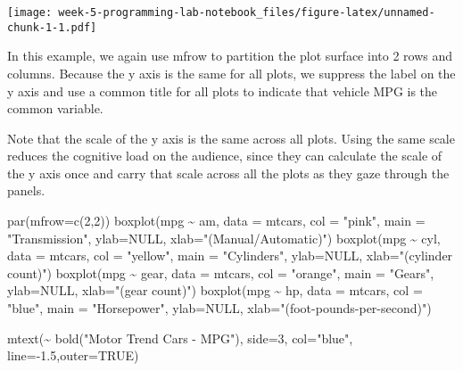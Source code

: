 \documentclass[
]{article}
\newenvironment{Shaded}{\begin{snugshade}}{\end{snugshade}}
\newcommand{\AttributeTok}[1]{\textcolor[rgb]{0.77,0.63,0.00}{#1}}
\newcommand{\ConstantTok}[1]{\textcolor[rgb]{0.00,0.00,0.00}{#1}}
\newcommand{\DecValTok}[1]{\textcolor[rgb]{0.00,0.00,0.81}{#1}}
\newcommand{\FloatTok}[1]{\textcolor[rgb]{0.00,0.00,0.81}{#1}}
\newcommand{\FunctionTok}[1]{\textcolor[rgb]{0.00,0.00,0.00}{#1}}
\newcommand{\NormalTok}[1]{#1}
\newcommand{\SpecialCharTok}[1]{\textcolor[rgb]{0.00,0.00,0.00}{#1}}
\newcommand{\StringTok}[1]{\textcolor[rgb]{0.31,0.60,0.02}{#1}}
\begin{document}
\texttt{[image: week-5-programming-lab-notebook\_files/figure-latex/unnamed-chunk-1-1.pdf]}

In this example, we again use mfrow to partition the plot surface into 2
rows and columns. Because the y axis is the same for all plots, we
suppress the label on the y axis and use a common title for all plots to
indicate that vehicle MPG is the common variable.

Note that the scale of the y axis is the same across all plots. Using
the same scale reduces the cognitive load on the audience, since they
can calculate the scale of the y axis once and carry that scale across
all the plots as they gaze through the panels.

\begin{Shaded}
\begin{Highlighting}[]
\FunctionTok{par}\NormalTok{(}\AttributeTok{mfrow=}\FunctionTok{c}\NormalTok{(}\DecValTok{2}\NormalTok{,}\DecValTok{2}\NormalTok{))}
\FunctionTok{boxplot}\NormalTok{(mpg }\SpecialCharTok{\textasciitilde{}}\NormalTok{ am, }\AttributeTok{data =}\NormalTok{ mtcars, }\AttributeTok{col =} \StringTok{"pink"}\NormalTok{, }\AttributeTok{main =} \StringTok{"Transmission"}\NormalTok{, }\AttributeTok{ylab=}\ConstantTok{NULL}\NormalTok{, }\AttributeTok{xlab=}\StringTok{"(Manual/Automatic)"}\NormalTok{)}
\FunctionTok{boxplot}\NormalTok{(mpg }\SpecialCharTok{\textasciitilde{}}\NormalTok{ cyl, }\AttributeTok{data =}\NormalTok{ mtcars, }\AttributeTok{col =} \StringTok{"yellow"}\NormalTok{, }\AttributeTok{main =} \StringTok{"Cylinders"}\NormalTok{, }\AttributeTok{ylab=}\ConstantTok{NULL}\NormalTok{, }\AttributeTok{xlab=}\StringTok{"(cylinder count)"}\NormalTok{)}
\FunctionTok{boxplot}\NormalTok{(mpg }\SpecialCharTok{\textasciitilde{}}\NormalTok{ gear, }\AttributeTok{data =}\NormalTok{ mtcars, }\AttributeTok{col =} \StringTok{"orange"}\NormalTok{, }\AttributeTok{main =} \StringTok{"Gears"}\NormalTok{, }\AttributeTok{ylab=}\ConstantTok{NULL}\NormalTok{, }\AttributeTok{xlab=}\StringTok{"(gear count)"}\NormalTok{)}
\FunctionTok{boxplot}\NormalTok{(mpg }\SpecialCharTok{\textasciitilde{}}\NormalTok{ hp, }\AttributeTok{data =}\NormalTok{ mtcars, }\AttributeTok{col =} \StringTok{"blue"}\NormalTok{, }\AttributeTok{main =} \StringTok{"Horsepower"}\NormalTok{, }\AttributeTok{ylab=}\ConstantTok{NULL}\NormalTok{, }\AttributeTok{xlab=}\StringTok{"(foot{-}pounds{-}per{-}second)"}\NormalTok{)}

\FunctionTok{mtext}\NormalTok{(}\SpecialCharTok{\textasciitilde{}} \FunctionTok{bold}\NormalTok{(}\StringTok{"Motor Trend Cars {-} MPG"}\NormalTok{), }\AttributeTok{side=}\DecValTok{3}\NormalTok{, }\AttributeTok{col=}\StringTok{"blue"}\NormalTok{, }\AttributeTok{line=}\SpecialCharTok{{-}}\FloatTok{1.5}\NormalTok{,}\AttributeTok{outer=}\ConstantTok{TRUE}\NormalTok{)}
\end{Highlighting}
\end{Shaded}
\end{document}
